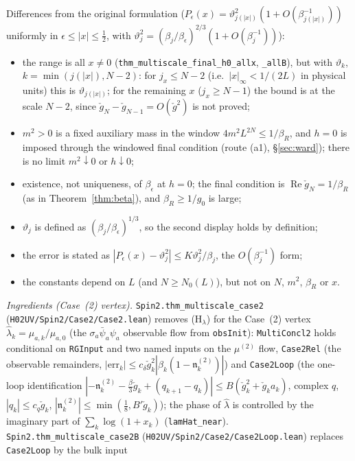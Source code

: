 \documentclass[11pt]{amsart}
\theoremstyle{definition}
\theoremstyle{remark}
\numberwithin{equation}{section}
\begin{document}
Differences from the original formulation ($P_\epsilon(x)=\vartheta_{j(|x|)}^2(1+O(\beta_{j(|x|)}^{-1}))$ uniformly in
$\epsilon\le|x|\le\frac12$, with $\vartheta_j^2=(\beta_j/\beta_\epsilon)^{2/3}(1+O(\beta_j^{-1}))$):
\begin{itemize}
\item the range is all $x\ne0$ (\texttt{thm\_multiscale\_final\_h0\_allx}, \texttt{\_allB}), but with $\vartheta_k$,
  $k=\min(j(|x|),N-2)$: for $j_x\le N-2$ (i.e.\ $|x|_\infty<1/(2L)$ in physical units) this is $\vartheta_{j(|x|)}$; for the remaining
  $x$ ($j_x\ge N-1$) the bound is at the scale $N-2$, since $\check g_N-\check g_{N-1}=O(\check g^2)$ is not proved;
\item $m^2>0$ is a fixed auxiliary mass in the window $4m^2L^{2N}\le1/\beta_R$, and $h=0$ is imposed through the windowed final
  condition (route (a1), \S\ref{sec:ward}); there is no limit $m^2\downarrow0$ or $h\downarrow0$;
\item existence, not uniqueness, of $\beta_\epsilon$ at $h=0$; the final condition is $\operatorname{Re}\check g_N=1/\beta_R$ (as in
  Theorem~\ref{thm:beta}), and $\beta_R\ge1/g_0$ is large;
\item $\vartheta_j$ is defined as $(\beta_j/\beta_\epsilon)^{1/3}$, so the second display holds by definition;
\item the error is stated as $|P_\epsilon(x)-\vartheta_j^2|\le K\vartheta_j^2/\beta_j$, the $O(\beta_j^{-1})$ form;
\item the constants depend on $L$ (and $N\ge N_0(L)$), but not on $N$, $m^2$, $\beta_R$ or $x$.
\end{itemize}
\emph{Ingredients (Case~(2) vertex).} \texttt{Spin2.thm\_multiscale\_case2} (\texttt{H02UV/Spin2/Case2/Case2.lean}) removes (H$_\lambda$) for the Case~(2) vertex
$\hat\lambda_k=\mu_{a,k}/\mu_{a,0}$ (the $\sigma_a\bar\psi_a\psi_a$ observable flow from \texttt{obsInit}): \texttt{MultiConcl2}
holds conditional on \texttt{RGInput} and two named inputs on the $\mu^{(2)}$ flow, \texttt{Case2Rel} (the observable
remainders, $|\mathrm{err}_k|\le c_\delta\check g_k^2|\beta_k(1-\mathfrak n^{(2)}_k)|$) and \texttt{Case2Loop} (the one-loop
identification $|-\mathfrak n^{(2)}_k-\frac\beta3\check g_k+(q_{k+1}-q_k)|\le B(\check g_k^2+\check g_ka_k)$, complex $q$,
$|q_k|\le c_q\check g_k$, $|\mathfrak n^{(2)}_k|\le\min(\frac18,B'\check g_k)$); the phase of $\hat\lambda$ is controlled by
the imaginary part of $\sum_k\log(1+x_k)$ (\texttt{lamHat\_near}).
\texttt{Spin2.thm\_multiscale\_case2B} (\texttt{H02UV/Spin2/Case2/Case2Loop.lean}) replaces \texttt{Case2Loop} by the bulk input
\end{document}
